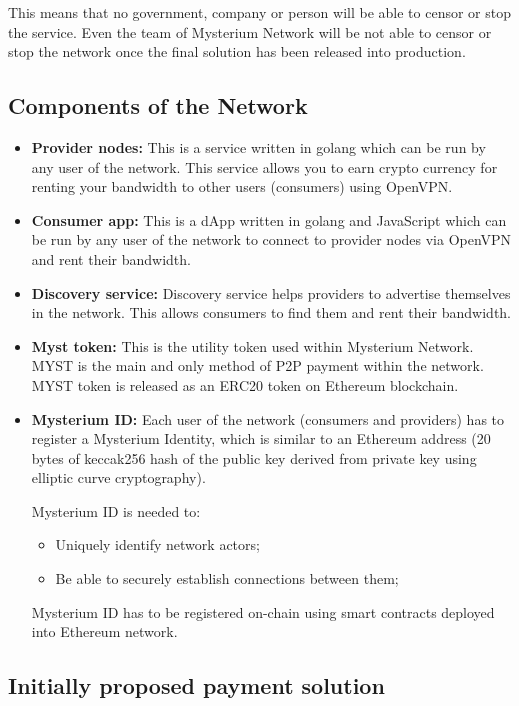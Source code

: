 \documentclass[a4paper,12pt]{article}
\begin{document}
This means that no government, company or person will be able to censor or stop 
the service. Even the team of Mysterium Network will be not able to censor or stop 
the network once the final solution has been released into production.

\subsection{Components of the Network}

\begin{itemize}
    \item \textbf{Provider nodes:} This is a service written in golang which can 
    be run by any user of the network. This service allows you to earn crypto 
    currency for renting your bandwidth to other users (consumers) using OpenVPN.
    \item \textbf{Consumer app:} This is a dApp written in golang and JavaScript 
    which can be run by any user of the network to connect to provider nodes via 
    OpenVPN and rent their bandwidth.
    \item \textbf{Discovery service:} Discovery service helps providers to advertise
    themselves in the network. This allows consumers to find them and rent their 
    bandwidth.
    \item \textbf{Myst token:} This is the utility token used within Mysterium 
    Network. MYST is the main and only method of P2P payment within the network. 
    MYST token is released as an ERC20 token on Ethereum blockchain.
    \item \textbf{Mysterium ID:} Each user of the network (consumers and providers)
    has to register a Mysterium Identity, which is similar to an Ethereum address 
    (20 bytes of keccak256 hash of the public key derived from private key using 
    elliptic curve cryptography).

    Mysterium ID is needed to:
    \begin{itemize}
        \item Uniquely identify network actors;
        \item Be able to securely establish connections between them;
    \end{itemize}

    Mysterium ID has to be registered on-chain using smart contracts deployed into 
    Ethereum network.
\end{itemize}

\subsection{Initially proposed payment solution}
\end{document}
